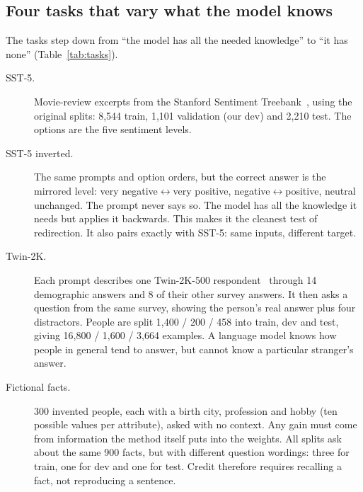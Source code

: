 \subsection{Four tasks that vary what the model knows}
The tasks step down from ``the model has all the needed knowledge'' to ``it has none'' (Table~\ref{tab:tasks}).
\begin{description}
  \item[SST-5.] Movie-review excerpts from the Stanford Sentiment Treebank~\citep{socher2013sst}, using the original splits: 8,544 train, 1,101 validation (our dev) and 2,210 test. The options are the five sentiment levels.
  \item[SST-5 inverted.] The same prompts and option orders, but the correct answer is the mirrored level: very negative$\leftrightarrow$very positive, negative$\leftrightarrow$positive, neutral unchanged. The prompt never says so. The model has all the knowledge it needs but applies it backwards. This makes it the cleanest test of redirection. It also pairs exactly with SST-5: same inputs, different target.
  \item[Twin-2K.] Each prompt describes one Twin-2K-500 respondent~\citep{toubia2025twin} through 14 demographic answers and 8 of their other survey answers. It then asks a question from the same survey, showing the person's real answer plus four distractors. People are split 1,400 / 200 / 458 into train, dev and test, giving 16,800 / 1,600 / 3,664 examples. A language model knows how people in general tend to answer, but cannot know a particular stranger's answer.
  \item[Fictional facts.] 300 invented people, each with a birth city, profession and hobby (ten possible values per attribute), asked with no context. Any gain must come from information the method itself puts into the weights. All splits ask about the same 900 facts, but with different question wordings: three for train, one for dev and one for test. Credit therefore requires recalling a fact, not reproducing a sentence.
\end{description}

\begin{table}[t]
\centering\scriptsize
\resizebox{\linewidth}{!}{}
\caption{The four tasks (test accuracy, \%). \emph{Prior} predicts the most frequent training answer among the options shown: per survey item for Twin-2K, per attribute for facts, and over the whole task for SST-5. \emph{Probe} is the best dev accuracy of a multinomial logistic-regression probe on the base model's residual stream at the answer position. It is read at four depths (a quarter, half, three quarters and all of the layers) and after the final norm, and fitted on 2,048 train examples. \emph{Headroom} is probe minus base accuracy on the probe's dev sample. The last two columns repeat base accuracy and headroom for SmolLM2-1.7B.}
\label{tab:tasks}
\end{table}

